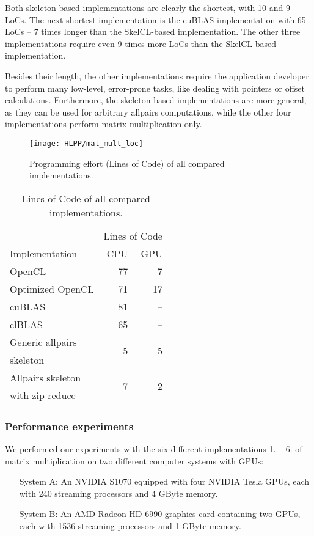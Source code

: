 Both skeleton-based implementations are clearly the shortest, with 10 and 9 LoCs.
The next shortest implementation is the cuBLAS implementation with 65 LoCs -- 7 times longer than the SkelCL-based implementation.
The other three implementations require even 9 times more LoCs than the SkelCL-based implementation.

Besides their length, the other implementations require the application developer to perform many low-level, error-prone tasks, like dealing with pointers or offset calculations.
Furthermore, the skeleton-based implementations are more general, as they can be used for arbitrary allpairs computations, while the other four implementations perform matrix multiplication only.
\vspace{4em}

\begin{figure}[t]
  \centering
  \texttt{[image: HLPP/mat\_mult\_loc]}
  \caption{Programming effort (Lines of Code) of all compared implementations.}
  \label{fig:mat_mult_loc}
\end{figure}
\begin{table}[b]
  \centering
  \begin{tabular}{lrr}
    \toprule
              & \multicolumn{2}{c}{Lines of Code} \\
    \cmidrule(r){2-3}
    Implementation & CPU & GPU \\
    \midrule
    OpenCL            & 77 &  7 \\
    Optimized OpenCL  & 71 & 17 \\
    cuBLAS            & 81 & -- \\
    clBLAS            & 65 & -- \\
    Generic allpairs  & \multirow{2}{*}{5} & \multirow{2}{*}{5}\\
    skeleton\\
    Allpairs skeleton & \multirow{2}{*}{7} & \multirow{2}{*}{2}\\
    with zip-reduce\\
    \bottomrule
  \end{tabular}
  \caption{Lines of Code of all compared implementations.}
  \label{tab:mat_mult_loc}
\end{table}

\subsubsection*{Performance experiments}
We performed our experiments with the six different implementations 1. -- 6. of matrix multiplication on two different computer systems with GPUs:
\begin{itemize}[leftmargin=50pt]
  \item[System A:] An NVIDIA S1070 equipped with four NVIDIA Tesla GPUs, each with 240 streaming processors and 4 GByte memory.
  \item[System B:] An AMD Radeon HD 6990 graphics card containing two GPUs, each with 1536 streaming processors and 1 GByte memory.
\end{itemize}

